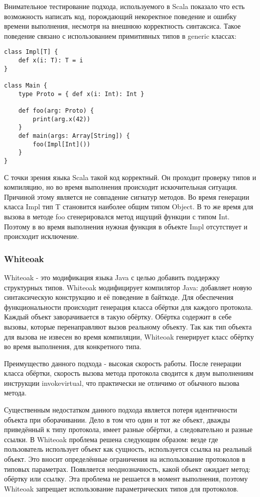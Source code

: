 \documentclass{spbau-diploma}
\begin{document}
Внимательное тестирование подхода, используемого в Scala показало что есть возможность написать код, порождающий некоректное поведение и ошибку времени выполнения, несмотря на внешнюю корректность синтаксиса. Такое поведение связано с использованием примитивных типов в generic классах:

\begin{verbatim}
class Impl[T] {
    def x(i: T): T = i
}

class Main {
    type Proto = { def x(i: Int): Int }

    def foo(arg: Proto) {
        print(arg.x(42))
    }
    def main(args: Array[String]) {
        foo(Impl[Int]())
    }
}
\end{verbatim}

С точки зрения языка Scala такой код корректный. Он проходит проверку типов и компиляцию, но во время выполнения происходит искючительная ситуация. Причиной этому является не совпадение сигнатур методов. Во время генерации класса Impl тип T становится наиболее общим типом Object. В то же время для вызова в методе foo сгенерировался метод ищущий функции с типом Int. Поэтому в во время выполнения нужная функция в объекте Impl отсутствует и происходит исключение.

\subsubsection{Whiteoak}
Whiteoak - это модификация языка Java с целью добавить поддержку структурных типов. Whiteoak модифицирует компилятор Java: добавляет новую синтаксическую конструкцию и её поведение в байткоде. Для обеспечения функциональности происходит генерация класса обёртки для каждого протокола. Каждый объект заворачивается в такую обёртку. Обёртка содержит в себе вызовы, которые перенаправляют вызов реальному объекту. Так как тип объекта для вызова не извесен во время компиляции, Whiteoak генерирует класс обёртку во время выполнения, для конкретного типа.

Преимущество данного подхода - высокая скорость работы. После генерации класса обёртки, скорость вызова метода протокола сводится к двум выполнениям инструкции invokevirtual, что практически не отличимо от обычного вызова метода.

Существенным недостатком данного подхода является потеря идентичности объекта при оборачивании. Дело в том что один и тот же объект, дважды приведённый к типу протокола, имеет разные обёртки, а следовательно и разные ссылки. В Whiteoak проблема решена следующим образом: везде где пользователь использует объект как сущность, используется ссылка на реальный объект. Это вносит определённые ограничения на использование протоколов в типовых параметрах. Появляется неоднозначность, какой объект ожидает метод: обёртку или ссылку. Эта проблема не решается в момент выполнения, поэтому Whiteoak запрещает использование параметрических типов для протоколов.
\end{document}
